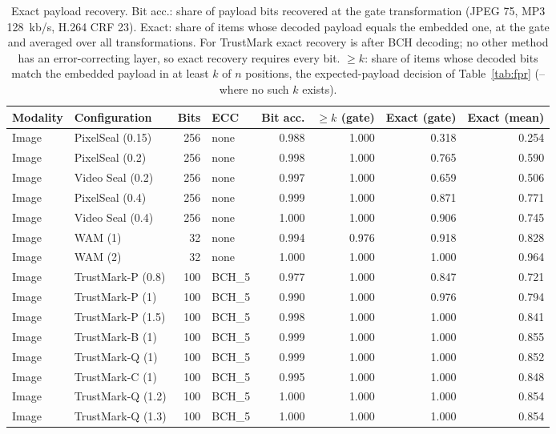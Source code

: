 \begin{table}[!t]
\centering
\footnotesize
\caption{Exact payload recovery. Bit acc.: share of payload bits recovered at the gate transformation (JPEG 75, MP3 128~kb/s, H.264 CRF 23). Exact: share of items whose decoded payload equals the embedded one, at the gate and averaged over all transformations. For TrustMark exact recovery is after BCH decoding; no other method has an error-correcting layer, so exact recovery requires every bit. $\geq k$: share of items whose decoded bits match the embedded payload in at least $k$ of $n$ positions, the expected-payload decision of Table~\ref{tab:fpr} (-- where no such $k$ exists).}
\label{tab:exact}
\setlength{\tabcolsep}{3.4pt}
\begin{tabular}{llrlrrrr}
\toprule
Modality & Configuration & Bits & ECC & Bit acc. & $\geq k$ (gate) & Exact (gate) & Exact (mean) \\
\midrule
Image & PixelSeal (0.15) & 256 & none & 0.988 & 1.000 & 0.318 & 0.254 \\
Image & PixelSeal (0.2) & 256 & none & 0.998 & 1.000 & 0.765 & 0.590 \\
Image & Video Seal (0.2) & 256 & none & 0.997 & 1.000 & 0.659 & 0.506 \\
Image & PixelSeal (0.4) & 256 & none & 0.999 & 1.000 & 0.871 & 0.771 \\
Image & Video Seal (0.4) & 256 & none & 1.000 & 1.000 & 0.906 & 0.745 \\
Image & WAM (1) & 32 & none & 0.994 & 0.976 & 0.918 & 0.828 \\
Image & WAM (2) & 32 & none & 1.000 & 1.000 & 1.000 & 0.964 \\
Image & TrustMark-P (0.8) & 100 & BCH\_5 & 0.977 & 1.000 & 0.847 & 0.721 \\
Image & TrustMark-P (1) & 100 & BCH\_5 & 0.990 & 1.000 & 0.976 & 0.794 \\
Image & TrustMark-P (1.5) & 100 & BCH\_5 & 0.998 & 1.000 & 1.000 & 0.841 \\
Image & TrustMark-B (1) & 100 & BCH\_5 & 0.999 & 1.000 & 1.000 & 0.855 \\
Image & TrustMark-Q (1) & 100 & BCH\_5 & 0.999 & 1.000 & 1.000 & 0.852 \\
Image & TrustMark-C (1) & 100 & BCH\_5 & 0.995 & 1.000 & 1.000 & 0.848 \\
Image & TrustMark-Q (1.2) & 100 & BCH\_5 & 1.000 & 1.000 & 1.000 & 0.854 \\
Image & TrustMark-Q (1.3) & 100 & BCH\_5 & 1.000 & 1.000 & 1.000 & 0.854 \\

\end{tabular}
\end{table}
